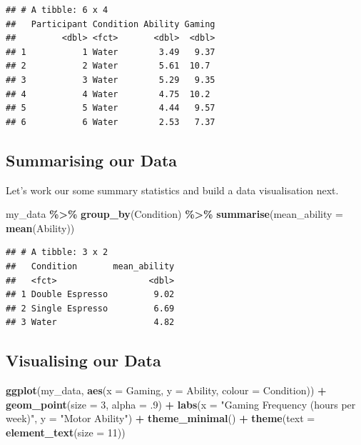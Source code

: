 \documentclass[
]{book}
\newenvironment{Shaded}{\begin{snugshade}}{\end{snugshade}}
\newcommand{\AttributeTok}[1]{\textcolor[rgb]{0.13,0.29,0.53}{#1}}
\newcommand{\DecValTok}[1]{\textcolor[rgb]{0.00,0.00,0.81}{#1}}
\newcommand{\FunctionTok}[1]{\textcolor[rgb]{0.13,0.29,0.53}{\textbf{#1}}}
\newcommand{\NormalTok}[1]{#1}
\newcommand{\SpecialCharTok}[1]{\textcolor[rgb]{0.81,0.36,0.00}{\textbf{#1}}}
\newcommand{\StringTok}[1]{\textcolor[rgb]{0.31,0.60,0.02}{#1}}
\begin{document}
\begin{verbatim}
## # A tibble: 6 x 4
##   Participant Condition Ability Gaming
##         <dbl> <fct>       <dbl>  <dbl>
## 1           1 Water        3.49   9.37
## 2           2 Water        5.61  10.7 
## 3           3 Water        5.29   9.35
## 4           4 Water        4.75  10.2 
## 5           5 Water        4.44   9.57
## 6           6 Water        2.53   7.37
\end{verbatim}

\hypertarget{summarising-our-data-3}{%
\subsection{Summarising our Data}\label{summarising-our-data-3}}

Let's work our some summary statistics and build a data visualisation next.

\begin{Shaded}
\begin{Highlighting}[]
\NormalTok{my\_data }\SpecialCharTok{\%\textgreater{}\%}
  \FunctionTok{group\_by}\NormalTok{(Condition) }\SpecialCharTok{\%\textgreater{}\%}
  \FunctionTok{summarise}\NormalTok{(}\AttributeTok{mean\_ability =} \FunctionTok{mean}\NormalTok{(Ability))}
\end{Highlighting}
\end{Shaded}

\begin{verbatim}
## # A tibble: 3 x 2
##   Condition       mean_ability
##   <fct>                  <dbl>
## 1 Double Espresso         9.02
## 2 Single Espresso         6.69
## 3 Water                   4.82
\end{verbatim}

\hypertarget{visualising-our-data-3}{%
\subsection{Visualising our Data}\label{visualising-our-data-3}}

\begin{Shaded}
\begin{Highlighting}[]
\FunctionTok{ggplot}\NormalTok{(my\_data, }\FunctionTok{aes}\NormalTok{(}\AttributeTok{x =}\NormalTok{ Gaming, }\AttributeTok{y =}\NormalTok{ Ability,  }\AttributeTok{colour =}\NormalTok{ Condition)) }\SpecialCharTok{+} 
  \FunctionTok{geom\_point}\NormalTok{(}\AttributeTok{size =} \DecValTok{3}\NormalTok{, }\AttributeTok{alpha =}\NormalTok{ .}\DecValTok{9}\NormalTok{) }\SpecialCharTok{+}
  \FunctionTok{labs}\NormalTok{(}\AttributeTok{x =} \StringTok{"Gaming Frequency (hours per week)"}\NormalTok{, }
       \AttributeTok{y =} \StringTok{"Motor Ability"}\NormalTok{) }\SpecialCharTok{+}
  \FunctionTok{theme\_minimal}\NormalTok{() }\SpecialCharTok{+}
  \FunctionTok{theme}\NormalTok{(}\AttributeTok{text =} \FunctionTok{element\_text}\NormalTok{(}\AttributeTok{size =} \DecValTok{11}\NormalTok{)) }
\end{Highlighting}
\end{Shaded}
\end{document}
